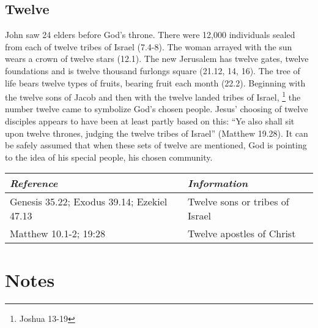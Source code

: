 \section*{Twelve}
John saw 24 elders before God's throne. There were 12,000 individuals sealed from each of twelve tribes of Israel (7.4-8). The woman arrayed with the sun wears a crown of twelve stars (12.1). The new Jerusalem has twelve gates, twelve foundations and is twelve thousand furlongs square (21.12, 14, 16). The tree of life bears twelve types of fruits, bearing fruit each month (22.2). 
\newline\newline
Beginning with the twelve sons of Jacob and then with the twelve landed tribes of Israel,%
\footnote{Joshua 13-19} %
the number twelve came to symbolize God's chosen people. Jesus' choosing of twelve disciples appears to have been at least partly based on this: ``Ye also shall sit upon twelve thrones, judging the twelve tribes of Israel'' (Matthew 19.28). 
\newline\newline
It can be safely assumed that when these sets of twelve are mentioned, God is pointing to the idea of his special people, his chosen community.
\newline\newline
\begin{tabularx}{\textwidth}{l X}
\toprule
\rowcolor{headergray}\emph{Reference} & \emph{Information}\\ 
\midrule
Genesis 35.22; Exodus 39.14; Ezekiel 47.13 & Twelve sons or tribes of Israel \\
\addlinespace
Matthew 10.1-2; 19:28 & Twelve apostles of Christ \\
\bottomrule
\end{tabularx}

\printindex[gen]
\chapter{Notes}
\renewcommand*{\BRbooktitlestyle}[1]{\textbf{#1}\nopagebreak}
\clearpage
{}
\printindex[scr]